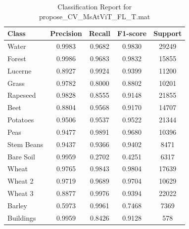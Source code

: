 \begin{table}[H]
    \centering
    \caption{Classification Report for propose\_CV\_MsAtViT\_FL\_T.mat}
    \begin{tabular}{lcccc}
        \toprule
        Class & Precision & Recall & F1-score & Support \\
        \midrule
        Water & 0.9983 & 0.9682 & 0.9830 & 29249 \\
        Forest & 0.9986 & 0.9683 & 0.9832 & 15855 \\
        Lucerne & 0.8927 & 0.9924 & 0.9399 & 11200 \\
        Grass & 0.9782 & 0.8000 & 0.8802 & 10201 \\
        Rapeseed & 0.9828 & 0.8555 & 0.9148 & 21855 \\
        Beet & 0.8804 & 0.9568 & 0.9170 & 14707 \\
        Potatoes & 0.9506 & 0.9537 & 0.9522 & 21344 \\
        Peas & 0.9477 & 0.9891 & 0.9680 & 10396 \\
        Stem Beans & 0.9437 & 0.9366 & 0.9402 & 8471 \\
        Bare Soil & 0.9959 & 0.2702 & 0.4251 & 6317 \\
        Wheat & 0.9765 & 0.9843 & 0.9804 & 17639 \\
        Wheat 2 & 0.9719 & 0.9689 & 0.9704 & 10629 \\
        Wheat 3 & 0.8877 & 0.9976 & 0.9394 & 22022 \\
        Barley & 0.5973 & 0.9961 & 0.7468 & 7369 \\
        Buildings & 0.9959 & 0.8426 & 0.9128 & 578 \\
        \bottomrule
    \end{tabular}
    \label{tab:propose_CV_MsAtViT_FL_T_mat}
\end{table}

